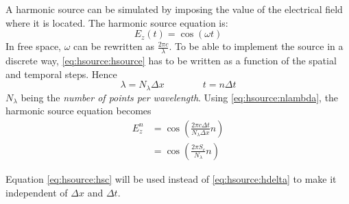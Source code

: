 A harmonic source can be simulated by imposing the value of the electrical field where it is located. The harmonic source equation is:
\begin{equation}\label{eq:hsource:hsource}
    E_z(t) = \cos(\omega t)
\end{equation}
In free space, $\omega$ can be rewritten as $\frac{2\pi c}{\lambda}$. To be able to implement the source in a discrete way, \eqref{eq:hsource:hsource} has to be written as a function of the spatial and temporal steps. Hence
\begin{equation}\label{eq:hsource:nlambda}
    \lambda = N_\lambda \Delta x\qquad \qquad t=n\Delta t
\end{equation}
$N_\lambda$ being the \emph{number of points per wavelength}. Using \eqref{eq:hsource:nlambda}, the harmonic source equation becomes
\begin{align}
    E_z^n &= \cos\left(\frac{2\pi c\Delta t}{N_\lambda \Delta x}n\right) \label{eq:hsource:hdelta}\\
    &= \cos\left(\frac{2\pi S_c}{N_\lambda}n\right) \label{eq:hsource:hsc}
\end{align}

Equation \eqref{eq:hsource:hsc} will be used instead of \eqref{eq:hsource:hdelta} to make it independent of $\Delta x$ and $\Delta t$.
